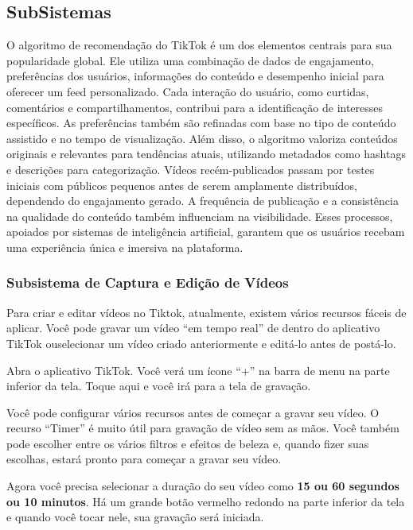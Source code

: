 \subsection{SubSistemas}

O algoritmo de recomendação do TikTok é um dos elementos centrais para sua popularidade global. Ele utiliza uma combinação de dados de engajamento, preferências dos usuários, informações do conteúdo e desempenho inicial para oferecer um feed personalizado. Cada interação do usuário, como curtidas, comentários e compartilhamentos, contribui para a identificação de interesses específicos. As preferências também são refinadas com base no tipo de conteúdo assistido e no tempo de visualização. Além disso, o algoritmo valoriza conteúdos originais e relevantes para tendências atuais, utilizando metadados como hashtags e descrições para categorização. Vídeos recém-publicados passam por testes iniciais com públicos pequenos antes de serem amplamente distribuídos, dependendo do engajamento gerado. A frequência de publicação e a consistência na qualidade do conteúdo também influenciam na visibilidade. Esses processos, apoiados por sistemas de inteligência artificial, garantem que os usuários recebam uma experiência única e imersiva na plataforma.


\newpage

\subsubsection{Subsistema de Captura e Edição de Vídeos}

Para criar e editar vídeos no Tiktok, atualmente, existem vários recursos fáceis de aplicar. Você pode gravar um vídeo “em tempo real” de dentro do aplicativo TikTok ouselecionar um vídeo criado anteriormente e editá-lo antes de postá-lo. \vskip0.3cm

Abra o aplicativo TikTok. Você verá um ícone “+” na barra de menu na parte inferior da tela. Toque aqui e você irá para a tela de gravação.\vskip0.3cm

Você pode configurar vários recursos antes de começar a gravar seu vídeo. O recurso “Timer” é muito útil para gravação de vídeo sem as mãos. Você também pode escolher entre os vários filtros e efeitos de beleza e, quando fizer suas escolhas, estará pronto para começar a gravar seu vídeo.\vskip0.3cm

Agora você precisa selecionar a duração do seu vídeo como\textbf{ 15 ou 60 segundos ou 10 minutos}. Há um grande botão vermelho redondo na parte inferior da tela e quando você tocar nele, sua gravação será iniciada.\vskip0.3cm

